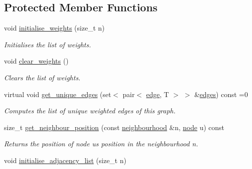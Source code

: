 \subsection*{Protected Member Functions}
\begin{DoxyCompactItemize}
\item 
void \hyperlink{classlgraph_1_1utils_1_1wxgraph_a0b0c0b54acbc7816eb5b9958e61805cf}{initialise\+\_\+weights} (size\+\_\+t n)\hypertarget{classlgraph_1_1utils_1_1wxgraph_a0b0c0b54acbc7816eb5b9958e61805cf}{}\label{classlgraph_1_1utils_1_1wxgraph_a0b0c0b54acbc7816eb5b9958e61805cf}

\begin{DoxyCompactList}\small\item\em Initialises the list of weights. \end{DoxyCompactList}\item 
void \hyperlink{classlgraph_1_1utils_1_1wxgraph_a145f81ae3609af5ec038ace8b4413fad}{clear\+\_\+weights} ()\hypertarget{classlgraph_1_1utils_1_1wxgraph_a145f81ae3609af5ec038ace8b4413fad}{}\label{classlgraph_1_1utils_1_1wxgraph_a145f81ae3609af5ec038ace8b4413fad}

\begin{DoxyCompactList}\small\item\em Clears the list of weights. \end{DoxyCompactList}\item 
virtual void \hyperlink{classlgraph_1_1utils_1_1wxgraph_ae49fda28107ce983b8f0d641468e9a75}{get\+\_\+unique\+\_\+edges} (set$<$ pair$<$ \hyperlink{namespacelgraph_1_1utils_a6510284ce1b1ae5dc97ce5d2de426e10}{edge}, T $>$ $>$ \&\hyperlink{classlgraph_1_1utils_1_1wxgraph_a73b6c8887d5088750ee2cc98c45089c6}{edges}) const =0
\begin{DoxyCompactList}\small\item\em Computes the list of unique weighted edges of this graph. \end{DoxyCompactList}\item 
size\+\_\+t \hyperlink{classlgraph_1_1utils_1_1xxgraph_aac7ef2134cad9529869f1334de7892d9}{get\+\_\+neighbour\+\_\+position} (const \hyperlink{namespacelgraph_1_1utils_a0f2ef47028a466d26841709e705390ac}{neighbourhood} \&n, \hyperlink{namespacelgraph_1_1utils_a7bd66ede3805ef121bc2835bd48de0cf}{node} u) const 
\begin{DoxyCompactList}\small\item\em Returns the position of node {\itshape u\textquotesingle{}s} position in the neighbourhood {\itshape n}. \end{DoxyCompactList}\item 
void \hyperlink{classlgraph_1_1utils_1_1xxgraph_a2201aaff5e9ffa29a9b3abfde705dd46}{initialise\+\_\+adjacency\+\_\+list} (size\+\_\+t n)\hypertarget{classlgraph_1_1utils_1_1xxgraph_a2201aaff5e9ffa29a9b3abfde705dd46}{}\label{classlgraph_1_1utils_1_1xxgraph_a2201aaff5e9ffa29a9b3abfde705dd46}


\end{DoxyCompactItemize}
